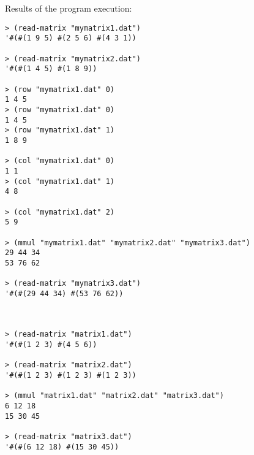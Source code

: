 \documentclass{article}
\begin{document}
\paragraph{}\

	Results of the program execution:
\begin{verbatim}
> (read-matrix "mymatrix1.dat")
'#(#(1 9 5) #(2 5 6) #(4 3 1))

> (read-matrix "mymatrix2.dat")
'#(#(1 4 5) #(1 8 9))

> (row "mymatrix1.dat" 0)
1 4 5 
> (row "mymatrix1.dat" 0)
1 4 5 
> (row "mymatrix1.dat" 1)
1 8 9 

> (col "mymatrix1.dat" 0)
1 1 
> (col "mymatrix1.dat" 1)
4 8 

> (col "mymatrix1.dat" 2)
5 9 

> (mmul "mymatrix1.dat" "mymatrix2.dat" "mymatrix3.dat")
29 44 34 
53 76 62 

> (read-matrix "mymatrix3.dat")
'#(#(29 44 34) #(53 76 62))



> (read-matrix "matrix1.dat")
'#(#(1 2 3) #(4 5 6))

> (read-matrix "matrix2.dat")
'#(#(1 2 3) #(1 2 3) #(1 2 3))

> (mmul "matrix1.dat" "matrix2.dat" "matrix3.dat")
6 12 18 
15 30 45 

> (read-matrix "matrix3.dat")
'#(#(6 12 18) #(15 30 45))


\end{verbatim}
\end{document}
